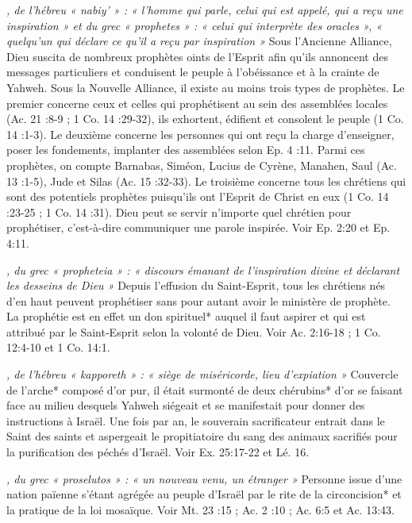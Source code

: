 \begin{multicols}{2}
{\textit{, de l'hébreu « nabiy' » : « l'homme qui parle, celui qui est appelé, qui a reçu une inspiration » et du grec « prophetes » : « celui qui interprète des oracles », « quelqu'un qui déclare ce qu'il a reçu par inspiration »}\newline
Sous l'Ancienne Alliance, Dieu suscita de nombreux prophètes oints de l'Esprit afin qu'ils annoncent des messages particuliers et conduisent le peuple à l'obéissance et à la crainte de Yahweh. Sous la Nouvelle Alliance, il existe au moins trois types de prophètes. Le premier concerne ceux et celles qui prophétisent au sein des assemblées locales (Ac. 21 :8-9 ; 1 Co. 14 :29-32), ils exhortent, édifient et consolent le peuple (1 Co. 14 :1-3). Le deuxième concerne les personnes qui ont reçu la charge d'enseigner, poser les fondements, implanter des assemblées selon Ep. 4 :11. Parmi ces prophètes, on compte Barnabas, Siméon, Lucius de Cyrène, Manahen, Saul (Ac. 13 :1-5), Jude et Silas (Ac. 15 :32-33). Le troisième concerne tous les chrétiens qui sont des potentiels prophètes puisqu'ils ont l'Esprit de Christ en eux (1 Co. 14 :23-25 ; 1 Co. 14 :31). Dieu peut se servir n'importe quel chrétien pour prophétiser, c'est-à-dire communiquer une parole inspirée. Voir Ep. 2:20 et Ep. 4:11.

\textit{, du grec « propheteia » : « discours émanant de l'inspiration divine et déclarant les desseins de Dieu »}\newline
Depuis l'effusion du Saint-Esprit, tous les chrétiens nés d'en haut peuvent prophétiser sans pour autant avoir le ministère de prophète. La prophétie est en effet un don spirituel* auquel il faut aspirer et qui est attribué par le Saint-Esprit selon la volonté de Dieu. Voir Ac. 2:16-18 ; 1 Co. 12:4-10 et 1 Co. 14:1.

\textit{, de l'hébreu « kapporeth » : « siège de miséricorde, lieu d'expiation »}\newline
Couvercle de l'arche* composé d'or pur, il était surmonté de deux chérubins* d'or se faisant face au milieu desquels Yahweh siégeait et se manifestait pour donner des instructions à Israël. Une fois par an, le souverain sacrificateur entrait dans le Saint des saints et aspergeait le propitiatoire du sang des animaux sacrifiés pour la purification des péchés d'Israël. Voir Ex. 25:17-22 et Lé. 16.

\textit{, du grec « proselutos » : « un nouveau venu, un étranger »}\newline
Personne issue d'une nation païenne s'étant agrégée au peuple d'Israël par le rite de la circoncision* et la pratique de la loi mosaïque. Voir Mt. 23 :15 ; Ac. 2 :10 ; Ac. 6:5 et Ac. 13:43.

}
\end{multicols}
